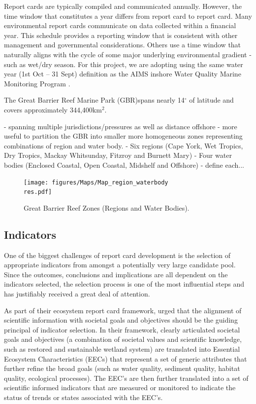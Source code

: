 Report cards are typically compiled and communicated annually.  However, the time window that
constitutes a year differs from report card to report card.  Many environmental report cards
communicate on data collected within a financial year.  This schedule provides a reporting window
that is consistent with other management and governmental considerations.  Others use a time window
that naturally aligns with the cycle of some major underlying environmental gradient - such as
wet/dry season. For this project, we are adopting using the same water year (1st Oct -- 31 Sept)
definition as the AIMS inshore Water Quality Marine Monitoring Program \citep{Lonborg-MMP-2015}.

The Great Barrier Reef Marine Park (GBR)spans nearly 14$^\circ$ of latitude and covers approximately
344,400km$^2$.

- spanning multiple jurisdictions/pressures as well as distance offshore - more useful to partition
the GBR into smaller more homogeneous zones representing combinations of region and water body.  -
Six regions (Cape York, Wet Tropics, Dry Tropics, Mackay Whitsunday, Fitzroy and Burnett Mary) -
Four water bodies (Enclosed Coastal, Open Coastal, Midshelf and Offshore) - define each...
 

  

\begin{figure}[ptbh] \texttt{[image: figures/Maps/Map\_region\_waterbody\\res.pdf]}
\caption{Great Barrier Reef Zones (Regions and Water Bodies).}\label{fig:Map_region_waterbody}
\end{figure}
   



\subsection{Indicators}

One of the biggest challenges of report card development is the selection of appropriate indicators
from amongst a potentially very large candidate pool.  Since the outcomes, conclusions and
implications are all dependent on the indicators selected, the selection process is one of the most
influential steps and has justifiably received a great deal of attention.

As part of their ecosystem report card framework, \citet{Harwell-1999} urged that the alignment of
scientific information with societal goals and objectives should be the guiding principal of
indicator selection.  In their framework, clearly articulated societal goals and objectives (a
combination of societal values and scientific knowledge, such as restored and sustainable wetland
system) are translated into Essential Ecosystem Characteristics (EECs) that represent a set of
generic attributes that further refine the broad goals (such as water quality, sediment quality,
habitat quality, ecological processes).  The EEC's are then further translated into a set of
scientific informed indicators that are measured or monitored to indicate the status of trends or
states associated with the EEC's.
  
